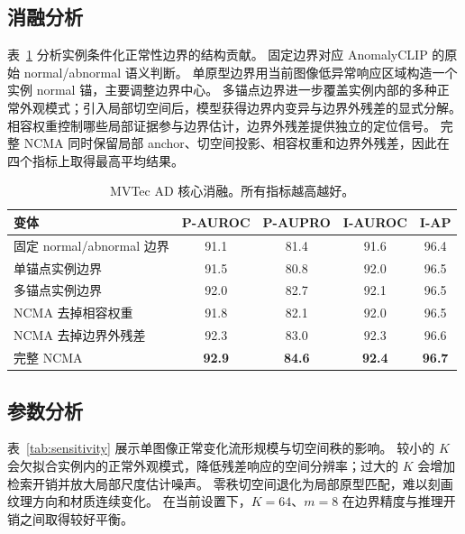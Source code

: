 \documentclass[UTF8,11pt,a4paper,fontset=none]{ctexart}
\newcommand{\method}{NCMA}
\begin{document}
\subsection{消融分析}
\label{sec:ablation}

表~\ref{tab:ablation} 分析实例条件化正常性边界的结构贡献。
固定边界对应 AnomalyCLIP 的原始 normal/abnormal 语义判断。
单原型边界用当前图像低异常响应区域构造一个实例 normal 锚，主要调整边界中心。
多锚点边界进一步覆盖实例内部的多种正常外观模式；引入局部切空间后，模型获得边界内变异与边界外残差的显式分解。
相容权重控制哪些局部证据参与边界估计，边界外残差提供独立的定位信号。
完整 \method{} 同时保留局部 anchor、切空间投影、相容权重和边界外残差，因此在四个指标上取得最高平均结果。

\begin{table}[H]
  \centering
  \caption{MVTec AD 核心消融。所有指标越高越好。}
  \label{tab:ablation}
  \small
  \begin{tabular}{lcccc}
    \toprule
    变体 & P-AUROC & P-AUPRO & I-AUROC & I-AP \\
    \midrule
    固定 normal/abnormal 边界 & 91.1 & 81.4 & 91.6 & 96.4 \\
    单锚点实例边界 & 91.5 & 80.8 & 92.0 & 96.5 \\
    多锚点实例边界 & 92.0 & 82.7 & 92.1 & 96.5 \\
    \method{} 去掉相容权重 & 91.8 & 82.1 & 92.0 & 96.5 \\
    \method{} 去掉边界外残差 & 92.3 & 83.0 & 92.3 & 96.6 \\
    完整 \method{} & \textbf{92.9} & \textbf{84.6} & \textbf{92.4} & \textbf{96.7} \\
    \bottomrule
  \end{tabular}
\end{table}

\subsection{参数分析}
\label{sec:sensitivity}

表~\ref{tab:sensitivity} 展示单图像正常变化流形规模与切空间秩的影响。
较小的 \(K\) 会欠拟合实例内的正常外观模式，降低残差响应的空间分辨率；过大的 \(K\) 会增加检索开销并放大局部尺度估计噪声。
零秩切空间退化为局部原型匹配，难以刻画纹理方向和材质连续变化。
在当前设置下，\(K=64\)、\(m=8\) 在边界精度与推理开销之间取得较好平衡。
\end{document}
